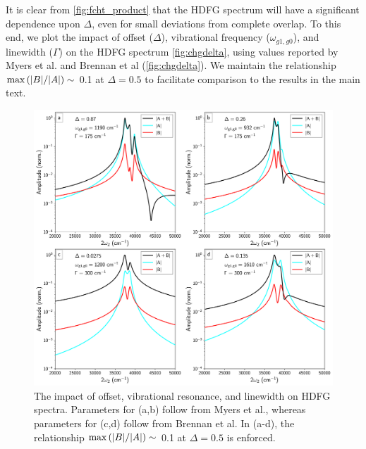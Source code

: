 \documentclass[aip, jcp, reprint, onecolumn, nofootinbib]{revtex4-2}
\begin{document}
It is clear from \autoref{fig:fcht_product} that the HDFG spectrum will have a significant dependence upon $\Delta$, even for small deviations from complete overlap. 
To this end, we plot the impact of offset ($\Delta$), vibrational frequency ($\omega_{g1,g0}$), and linewidth ($\Gamma$) on the HDFG spectrum \autoref{fig:chgdelta}, using values reported by Myers et al. and Brennan et al (\autoref{fig:chgdelta}). \cite{Myers1982, Brennan2024}
We maintain the relationship $\max \left(\abs{B}/\abs{A}\right) \sim$ 0.1 at $\Delta = 0.5$ to facilitate comparison to the results in the main text.
\pagebreak
\begin{figure}[!htbp]
	\centering
	\includegraphics[width=6.675in]{figures/changedelta.png}
	\caption{The impact of offset, vibrational resonance, and linewidth on HDFG spectra. Parameters for (a,b) follow from Myers et al., whereas parameters for (c,d) follow from Brennan et al.\cite{Myers1982, Brennan2024}
	In (a-d), the relationship $\max \left(\abs{B}/\abs{A}\right) \sim$ 0.1 at $\Delta = 0.5$ is enforced.
} 
	\label{fig:chgdelta}
\end{figure}
\end{document}
